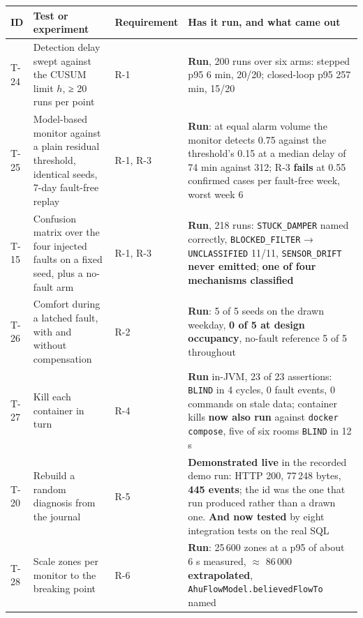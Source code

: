 \begin{longtable}[]{@{}
  >{\raggedright\arraybackslash}p{}
  >{\raggedright\arraybackslash}p{}
  >{\raggedright\arraybackslash}p{}
  >{\raggedright\arraybackslash}p{}@{}}
\toprule
\textbf{ID} & \textbf{Test or experiment} & \textbf{Requirement} & \textbf{Has it run, and what came
out} \\
\midrule
\endhead
T-24 & Detection delay swept against the CUSUM limit $h$, ≥ 20 runs per point & R-1 &
\textbf{Run}, 200 runs over six arms: stepped p95 6 min, 20/20; closed-loop p95 257 min, 15/20 \\
T-25 & Model-based monitor against a plain residual threshold, identical seeds, 7-day fault-free
replay & R-1, R-3 & \textbf{Run}: at equal alarm volume the monitor detects 0.75 against the
threshold's 0.15 at a median delay of 74 min against 312; R-3 \textbf{fails} at 0.55 confirmed cases
per fault-free week, worst week 6 \\
T-15 & Confusion matrix over the four injected faults on a fixed seed, plus a no-fault arm &
R-1, R-3 & \textbf{Run}, 218 runs: \texttt{STUCK\_DAMPER} named correctly,
\texttt{BLOCKED\_FILTER} → \texttt{UNCLASSIFIED} 11/11, \texttt{SENSOR\_DRIFT} \textbf{never
emitted}; \textbf{one of four mechanisms classified} \\
T-26 & Comfort during a latched fault, with and without compensation & R-2 & \textbf{Run}: 5 of 5
seeds on the drawn weekday, \textbf{0 of 5 at design occupancy}, no-fault reference 5 of 5
throughout \\
T-27 & Kill each container in turn & R-4 & \textbf{Run} in-JVM, 23 of 23 assertions:
\texttt{BLIND} in 4 cycles, 0 fault events, 0 commands on stale data; container kills \textbf{now
also run} against \texttt{docker compose}, five of six rooms \texttt{BLIND} in 12 s \\
T-20 & Rebuild a random diagnosis from the journal & R-5 & \textbf{Demonstrated live} in the
recorded demo run: HTTP 200, 77\,248 bytes, \textbf{445 events}; the id was the one that run produced
rather than a drawn one. \textbf{And now tested} by eight integration tests on the real SQL \\
T-28 & Scale zones per monitor to the breaking point & R-6 & \textbf{Run}: 25\,600 zones at a p95
of about 6 s measured, $\approx$ 86\,000 \textbf{extrapolated},
\texttt{AhuFlowModel.believedFlowTo} named \\

\end{longtable}
